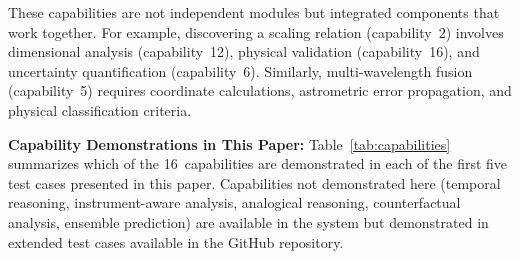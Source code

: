 \documentclass[usenatbib]{rasti}
\begin{document}
These capabilities are not independent modules but integrated components that work together.
For example, discovering a scaling relation (capability~2) involves dimensional analysis (capability~12), physical validation (capability~16), and uncertainty quantification (capability~6).
Similarly, multi-wavelength fusion (capability~5) requires coordinate calculations, astrometric error propagation, and physical classification criteria.

\textbf{Capability Demonstrations in This Paper:}
Table~\ref{tab:capabilities} summarizes which of the 16~capabilities are demonstrated in each of the first five test cases presented in this paper.
Capabilities not demonstrated here (temporal reasoning, instrument-aware analysis, analogical reasoning, counterfactual analysis, ensemble prediction) are available in the system but demonstrated in extended test cases available in the GitHub repository.
\end{document}
